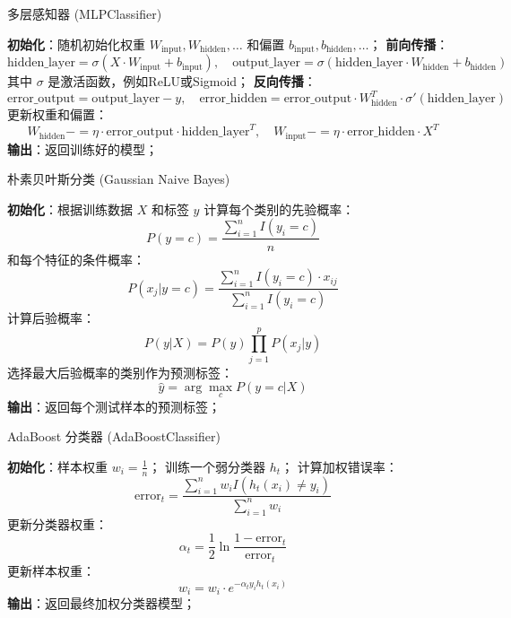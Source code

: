\documentclass{article}
\begin{document}
\begin{algorithm}
\caption{多层感知器 (MLPClassifier)}
\textbf{初始化}：随机初始化权重 $W_{\text{input}}, W_{\text{hidden}}, \dots$ 和偏置 $b_{\text{input}}, b_{\text{hidden}}, \dots$；
\textbf{前向传播}：
\[
\text{hidden\_layer} = \sigma(X \cdot W_{\text{input}} + b_{\text{input}}), \quad \text{output\_layer} = \sigma(\text{hidden\_layer} \cdot W_{\text{hidden}} + b_{\text{hidden}})
\]
其中 $\sigma$ 是激活函数，例如ReLU或Sigmoid；
\textbf{反向传播}：
\[
\text{error\_output} = \text{output\_layer} - y, \quad \text{error\_hidden} = \text{error\_output} \cdot W_{\text{hidden}}^T \cdot \sigma'(\text{hidden\_layer})
\]
更新权重和偏置：
\[
W_{\text{hidden}} -= \eta \cdot \text{error\_output} \cdot \text{hidden\_layer}^T, \quad W_{\text{input}} -= \eta \cdot \text{error\_hidden} \cdot X^T
\]
\textbf{输出}：返回训练好的模型；
\end{algorithm}

\begin{algorithm}
\caption{朴素贝叶斯分类 (Gaussian Naive Bayes)}
\textbf{初始化}：根据训练数据 $X$ 和标签 $y$ 计算每个类别的先验概率：
\[
P(y = c) = \frac{\sum_{i=1}^{n} I(y_i = c)}{n}
\]
和每个特征的条件概率：
\[
P(x_j | y = c) = \frac{\sum_{i=1}^{n} I(y_i = c) \cdot x_{ij}}{\sum_{i=1}^{n} I(y_i = c)}
\]
 {
    计算后验概率：
    \[
    P(y | X) = P(y) \prod_{j=1}^{p} P(x_j | y)
    \]
    选择最大后验概率的类别作为预测标签：
    \[
    \hat{y} = \arg\max_{c} P(y = c | X)
    \]
}
\textbf{输出}：返回每个测试样本的预测标签；
\end{algorithm}

\begin{algorithm}
\caption{AdaBoost 分类器 (AdaBoostClassifier)}
\textbf{初始化}：样本权重 $w_i = \frac{1}{n}$；
 {
    训练一个弱分类器 $h_t$；
    计算加权错误率：
    \[
    \text{error}_t = \frac{\sum_{i=1}^{n} w_i I(h_t(x_i) \neq y_i)}{\sum_{i=1}^{n} w_i}
    \]
    更新分类器权重：
    \[
    \alpha_t = \frac{1}{2} \ln \frac{1 - \text{error}_t}{\text{error}_t}
    \]
    更新样本权重：
    \[
    w_i = w_i \cdot e^{-\alpha_t y_i h_t(x_i)}
    \]
}
\textbf{输出}：返回最终加权分类器模型；
\end{algorithm}
\end{document}
